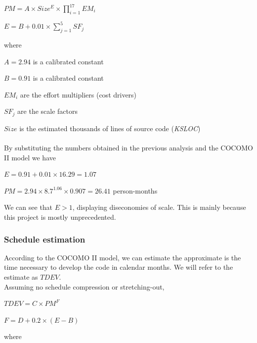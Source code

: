 \documentclass[english]{article}
\begin{document}
\begin{center}
$ PM = A \times Size^E \times \prod_{i=1}^{17} EM_i $
\end{center}

\begin{center}
$ E = B + 0.01 \times \sum_{j=1}^{5} SF_j $
\end{center}
where

$ A = 2.94 $ is a calibrated constant 

$ B = 0.91 $ is a calibrated constant

$EM_i$ are the effort multipliers (cost drivers)

$SF_j$ are the scale factors

$Size$ is the estimated thousands of lines of source code (\textit{KSLOC})


\paragraph{}
By substituting the numbers obtained in the previous analysis and the COCOMO II model we have

\begin{center}
$E = 0.91 + 0.01 \times 16.29 = 1.07$
\end{center}

\begin{center}
$PM = 2.94 \times 8.7^{1.06} \times 0.907 = 26.41$ person-months
\end{center}

We can see that $E > 1$, displaying diseconomies of scale. This is mainly because this project is mostly unprecedented.

\subsubsection{Schedule estimation}

According to the COCOMO II model, we can estimate the approximate is the time necessary to develop the code in calendar months. We will refer to the estimate as $TDEV$.\\
Assuming no schedule compression or stretching-out,

\begin{center}
	$TDEV = C \times PM^F$
\end{center}

\begin{center}
	$F = D + 0.2 \times (E-B)$
\end{center}
where
\end{document}
